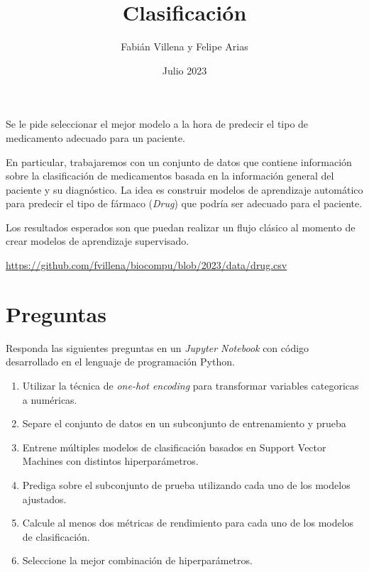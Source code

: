 \documentclass{article}
\title{Clasificación}
\author{Fabián Villena y Felipe Arias}
\date{Julio 2023}
\begin{document}
\maketitle

Se le pide seleccionar el mejor modelo a la hora de predecir el tipo de medicamento adecuado para un paciente.

En particular, trabajaremos con un conjunto de datos que contiene información sobre la clasificación de medicamentos basada en la información general del paciente y su diagnóstico. La idea es construir modelos de aprendizaje automático para predecir el tipo de fármaco (\textit{Drug}) que podría ser adecuado para el paciente.

Los resultados esperados son que puedan realizar un flujo clásico al momento de crear modelos de aprendizaje supervisado. 

\begin{center}
    \url{https://github.com/fvillena/biocompu/blob/2023/data/drug.csv}
\end{center}

\section*{Preguntas}

Responda las siguientes preguntas en un \textit{Jupyter Notebook} con código desarrollado en el lenguaje de programación Python.

\begin{enumerate}
	\item Utilizar la técnica de \textit{one-hot encoding} para transformar variables categoricas a numéricas.
    \item Separe el conjunto de datos en un subconjunto de entrenamiento y prueba
    \item Entrene múltiples modelos de clasificación basados en Support Vector Machines con distintos hiperparámetros.
    \item Prediga sobre el subconjunto de prueba utilizando cada uno de los modelos ajustados.
    \item Calcule al menos dos métricas de rendimiento para cada uno de los modelos de clasificación.
    \item Seleccione la mejor combinación de hiperparámetros.
\end{enumerate}
\end{document}
